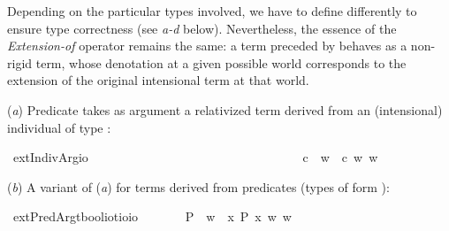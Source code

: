 \begin{isabellebody}
\begin{isamarkuptext}
Depending on the particular types involved, we have to define \isa{{\isasymdown}} differently to ensure type correctness
(see \emph{a-d} below). Nevertheless, the essence of the \emph{Extension-of} operator remains the same:
a term \isa{{\isasymalpha}} preceded by \isa{{\isasymdown}} behaves as a non-rigid term, whose denotation at a given possible world corresponds
to the extension of the original intensional term \isa{{\isasymalpha}} at that world.%
\end{isamarkuptext}\isamarkuptrue%
%
\begin{isamarkuptext}%
(\emph{a}) Predicate \isa{{\isasymphi}} takes as argument a relativized term derived from an (intensional) individual of type \isa{{\isasymup}{\isasymzero}}:%
\end{isamarkuptext}\isamarkuptrue%
\isamarkupfalse%
\ extIndivArg{\isacharcolon}{\isacharcolon}{\isachardoublequoteopen}{\isasymup}{\isasymlangle}{\isasymzero}{\isasymrangle}{\isasymRightarrow}{\isasymup}{\isasymzero}{\isasymRightarrow}io{\isachardoublequoteclose}\ {\isacharparenleft}\ {\isachardoublequoteopen}{\isasymdownharpoonleft}{\isachardoublequoteclose}\ {}{}{\isacharparenright}\ \ \ \ \ \ \ \ \ \ \ \ \ \ \ \ \ \ \ \ \ \ \ \ \ \ \ \isanewline
\ \ \ {\isachardoublequoteopen}{\isasymphi}\ {\isasymdownharpoonleft}c\ {\isasymequiv}\ {\isasymlambda}w{\isachardot}\ {\isasymphi}\ {\isacharparenleft}c\ w{\isacharparenright}\ w{\isachardoublequoteclose}%
\begin{isamarkuptext}%
(\emph{b}) A variant of (\emph{a}) for terms derived from predicates (types of form ):%
\end{isamarkuptext}\isamarkuptrue%
\isamarkupfalse%
\ extPredArg{\isacharcolon}{\isacharcolon}{\isachardoublequoteopen}{\isacharparenleft}{\isacharparenleft}{\isacharprime}t{\isasymRightarrow}bool{\isacharparenright}{\isasymRightarrow}io{\isacharparenright}{\isasymRightarrow}{\isacharparenleft}{\isacharprime}t{\isasymRightarrow}io{\isacharparenright}{\isasymRightarrow}io{\isachardoublequoteclose}\ {\isacharparenleft}\ {\isachardoublequoteopen}{\isasymdown}{\isachardoublequoteclose}\ {}{}{\isacharparenright}\isanewline
\ \ \ {\isachardoublequoteopen}{\isasymphi}\ {\isasymdown}P\ {\isasymequiv}\ {\isasymlambda}w{\isachardot}\ {\isasymphi}\ {\isacharparenleft}{\isasymlambda}x{\isachardot}\ P\ x\ w{\isacharparenright}\ w{\isachardoublequoteclose}%

\end{isabellebody}
